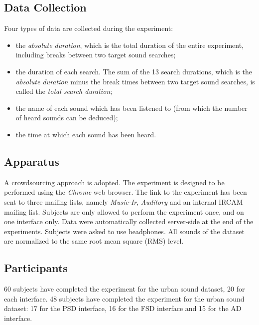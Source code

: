 \documentclass{aes2e}
\begin{document}
\subsection{Data Collection}
Four types of data are collected during the experiment:
\begin{itemize}
\item the \textit{absolute duration}, which is the total duration of the entire experiment, including breaks between two target sound searches;
\item the duration of each search. The sum of the 13 search durations, which is the \textit{absolute duration} minus the break times between two target sound searches, is called the \textit{total search duration};
\item the name of each sound which has been listened to (from which the number of heard sounds can be deduced);
\item the time at which each sound has been heard.  
\end{itemize}

\subsection{Apparatus}

A crowdsourcing approach is adopted. The experiment is designed to be performed using the \textit{Chrome} web browser. The link to the experiment has been sent to three  mailing lists, namely \textit{Music-Ir}, \textit{Auditory} and an internal IRCAM mailing list. Subjects are only allowed to perform the experiment once, and on one interface only. Data were automatically collected server-side at the end of the experiments. Subjects were asked to use headphones. All sounds of the dataset are normalized to the same root mean square (RMS) level.


\subsection{Participants}

60 subjects have completed the experiment for the urban sound dataset, 20 for each interface. 48 subjects have completed the experiment for the urban sound dataset: 17 for the PSD interface, 16 for the FSD interface and 15 for the AD interface.
\end{document}
